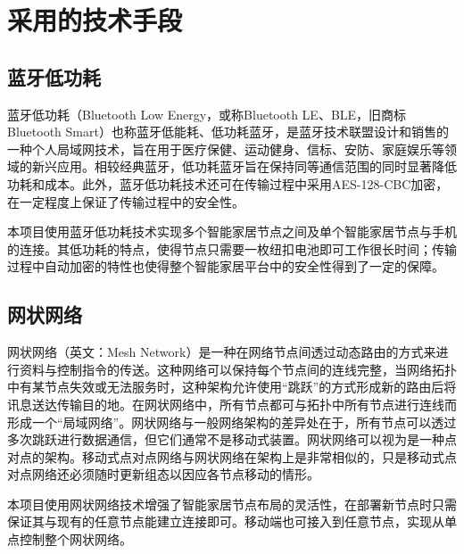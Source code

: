 \chapter{采用的技术手段}

\section{蓝牙低功耗}
蓝牙低功耗（Bluetooth Low Energy，或称Bluetooth LE、BLE，旧商标Bluetooth Smart）也称蓝牙低能耗、低功耗蓝牙，是蓝牙技术联盟设计和销售的一种个人局域网技术，旨在用于医疗保健、运动健身、信标、安防、家庭娱乐等领域的新兴应用。相较经典蓝牙，低功耗蓝牙旨在保持同等通信范围的同时显著降低功耗和成本。\cite{ble}此外，蓝牙低功耗技术还可在传输过程中采用AES-128-CBC加密，在一定程度上保证了传输过程中的安全性。

本项目使用蓝牙低功耗技术实现多个智能家居节点之间及单个智能家居节点与手机的连接。其低功耗的特点，使得节点只需要一枚纽扣电池即可工作很长时间；传输过程中自动加密的特性也使得整个智能家居平台中的安全性得到了一定的保障。

\section{网状网络}
网状网络（英文：Mesh Network）是一种在网络节点间透过动态路由的方式来进行资料与控制指令的传送。这种网络可以保持每个节点间的连线完整，当网络拓扑中有某节点失效或无法服务时，这种架构允许使用“跳跃”的方式形成新的路由后将讯息送达传输目的地。在网状网络中，所有节点都可与拓扑中所有节点进行连线而形成一个“局域网络”。网状网络与一般网络架构的差异处在于，所有节点可以透过多次跳跃进行数据通信，但它们通常不是移动式装置。网状网络可以视为是一种点对点的架构。移动式点对点网络与网状网络在架构上是非常相似的，只是移动式点对点网络还必须随时更新组态以因应各节点移动的情形。\cite{mesh}

本项目使用网状网络技术增强了智能家居节点布局的灵活性，在部署新节点时只需保证其与现有的任意节点能建立连接即可。移动端也可接入到任意节点，实现从单点控制整个网状网络。
